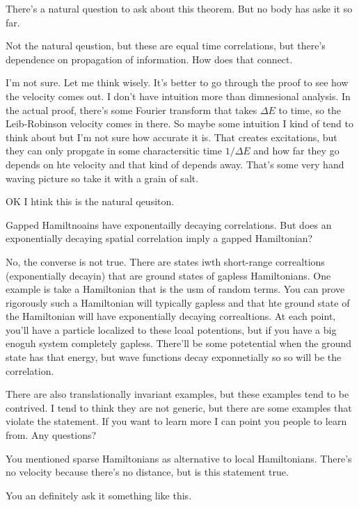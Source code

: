 There's a natural question to ask about this theorem.
But no body has aske it so far.

\begin{question}
    Not the natural qeustion, but these are equal time correlations,
    but there's dependence on propagation of information.
    How does that connect.
\end{question}
I'm not sure.
Let me think wisely.
It's better to go through the proof to see how the velocity comes out.
I don't have intuition more than dimnesional analysis.
In the actual proof, there's some Fourier transform that takes $\Delta E$ to
time, so the Leib-Robinson velocity comes in there.
So maybe some intuition I kind of tend to think about but I'm not sure how
accurate it is.
That creates excitations, but they can only propgate in some charactersitic time
$1/\Delta E$ and how far they go depends on hte velocity and that kind of
depends away.
That's some very hand waving picture so take it with a grain of salt.

OK I htink this is the natural qeusiton.
\begin{question}
    Gapped Hamiltnoains have exponentailly decaying correlations.
    But does an exponentially decaying spatial correlation imply a gapped
    Hamiltonian?
\end{question}
No, the converse is not true.
There are states iwth short-range correaltions (exponentially decayin)
that are ground states of gapless Hamiltonians.
One example is take a Hamiltonian that is the usm of random terms.
You can prove rigorously such a Hamiltonian will typically gapless
and that hte ground state of the Hamiltonian will have exponentially decaying
correaltions.
At each point, you'll have a particle localized to these lcoal potentions,
but if you have a big enoguh system completely gapless.
There'll be some potetential when the ground state has that energy,
but wave functions decay exponnetially so so will be the correlation.


There are also translationally invariant examples,
but these examples tend to be contrived.
I tend to think they are not generic, but there are some examples that violate
the statement.
If you want to learn more I can point you people to learn from.
Any questions?


\begin{question}
    You mentioned sparse Hamiltonians as alternative to local Hamiltonians.
    There's no velocity because there's no distance,
    but is this statement true.
\end{question}
You an definitely ask it something like this.

